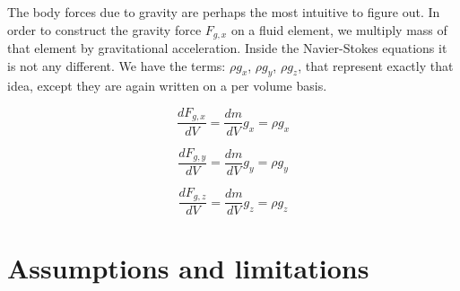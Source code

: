 The body forces due to gravity are perhaps the most intuitive to figure out. In order to construct the gravity force $F_{g, x}$ on a fluid element, we multiply mass of that element by gravitational acceleration. Inside the Navier-Stokes equations it is not any different. We have the terms: $\rho g_x$, $\rho g_y$, $\rho g_z$, that represent exactly that idea, except they are again written on a per volume basis.

\begin{equation}
\frac{d F_{g, x}}{dV} = \frac{dm}{dV} g_x =  \rho g_x
\end{equation}

\begin{equation}
\frac{d F_{g, y}}{dV} = \frac{dm}{dV} g_y =  \rho g_y
\end{equation}

\begin{equation}
\frac{d F_{g, z}}{dV} = \frac{dm}{dV} g_z =  \rho g_z
\end{equation}

\section{Assumptions and limitations}
